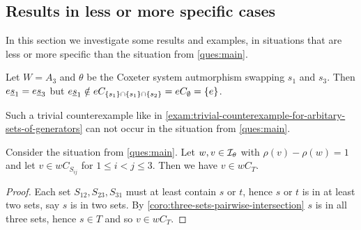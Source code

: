 \subsection{Results in less or more specific cases}
\label{sec:sec:main-thesis-less-more-specific}

%
%		

In this section we investigate some results and examples, in situations that are less or more specific than the situation from \ref{ques:main}.

\begin{exam}
	Let $W = A_3$ and $\theta$ be the Coxeter system autmorphism swapping $s_1$ and $s_3$. Then $e \underline{s}_1 = e \underline{s}_3$ but $e \underline{s}_1 \notin eC_{\{s_1\} \cap \{s_1\} \cap \{s_2\}} = eC_\emptyset = \{e\}$.
\end{exam}

Such a trivial counterexample like in \ref{exam:trivial-counterexample-for-arbitary-sets-of-generators} can not occur in the situation from \ref{ques:main}.

\begin{prop}
	Consider the situation from \ref{ques:main}. Let $w,v \in \mathcal{I}_{\theta}$ with $\rho(v) - \rho(w) = 1$ and let $v \in w C_{S_{ij}}$ for $1 \leq i < j \leq 3$. Then we have $v \in wC_T$.

	\begin{proof}
		Each set $S_{12},S_{23},S_{31}$ must at least contain $s$ or $t$, hence $s$ or $t$ is in at least two sets, say $s$ is in two sets. By \ref{coro:three-sets-pairwise-intersection} $s$ is in all three sets, hence $s \in T$ and so $v \in wC_T$.
	\end{proof}
\end{prop}

